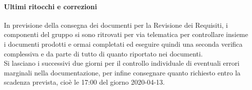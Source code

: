 \documentclass{article}
\begin{document}
\paragraph*{Ultimi ritocchi e correzioni}
In previsione della consegna dei documenti per la Revisione dei Requisiti, i componenti del gruppo si sono ritrovati per via telematica per controllare insieme i documenti prodotti e ormai completati ed eseguire quindi una seconda verifica complessiva e da parte di tutto di quanto riportato nei documenti. \\
Si lasciano i successivi due giorni per il controllo individuale di eventuali errori marginali nella documentazione, per infine consegnare quanto richiesto entro la scadenza prevista, cioè le 17:00 del giorno 2020-04-13.
\end{document}
